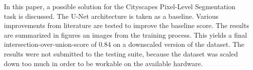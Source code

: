 In this paper, a possible solution for the Cityscapes Pixel-Level Segmentation task is discussed.
The U-Net architecture is taken as a baseline. Various improvements from literature are tested to improve the baseline score. The results are summarized in figures an images from the training process. This yields a final intersection-over-union-score of 0.84 on a downscaled version of the dataset. The results were not submitted to the testing suite, because the dataset was scaled down too much in order to be workable on the available hardware.
